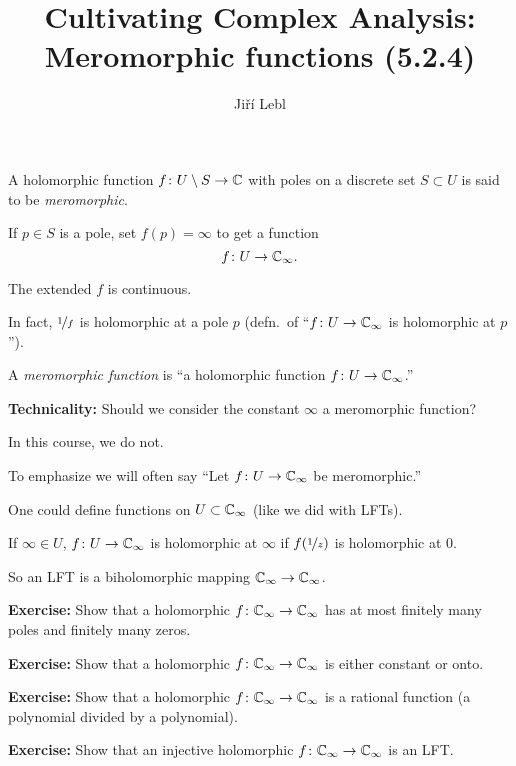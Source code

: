 \documentclass[10pt,aspectratio=169]{beamer}
\author{Ji\v{r}\'i Lebl}
\institute[OSU]{%
Departemento pri Matematiko de Oklahoma {\^S}tata Universitato}
\title{Cultivating Complex Analysis:\\%
Meromorphic functions (5.2.4)}
\date{}
\begin{document}
\begin{frame}
\titlepage
\end{frame}

\begin{frame}
\begin{definition}
A holomorphic function $f \colon U \setminus S \to {\mathbb{C}}$ with poles on a
discrete set $S \subset U$ is said to be \emph{meromorphic}.
\end{definition}

\pause

If $p \in S$ is a pole, set
$f(p) = \infty$ to get a function
\[
f \colon U \to {\mathbb{C}}_{\infty} .
\]

\pause
The extended $f$ is continuous.

\pause
\medskip

In fact, $\nicefrac{1}{f}$ is holomorphic at a pole $p$
\quad
(defn.\ of ``$f \colon U \to {\mathbb{C}}_\infty$ is holomorphic at $p$'').

\pause
\medskip

A \emph{meromorphic function} is
``a holomorphic function $f \colon U \to {\mathbb{C}}_{\infty}$.''

\pause
\medskip

\textbf{Technicality:} Should we consider the constant $\infty$
a meromorphic function?

\pause
In this course, we do not.

\pause
\medskip

To emphasize we will often say
``Let 
$f \colon U \to {\mathbb{C}}_\infty$ be meromorphic.''

\end{frame}

\begin{frame}

One could define functions on $U \subset {\mathbb{C}}_\infty$ (like we did with LFTs).

\pause
\medskip

If $\infty \in U$,
\quad
$f \colon U \to {\mathbb{C}}_\infty$ is holomorphic at $\infty$ if
$f(\nicefrac{1}{z})$ is holomorphic at $0$.

\pause
\medskip

So an LFT is a biholomorphic mapping ${\mathbb{C}}_\infty \to {\mathbb{C}}_\infty$.

\pause
\medskip

\textbf{Exercise:}
Show that a holomorphic $f \colon {\mathbb{C}}_\infty \to {\mathbb{C}}_\infty$ has
at most finitely many poles and finitely many zeros.

\pause
\medskip

\textbf{Exercise:}
Show that a holomorphic $f \colon {\mathbb{C}}_\infty \to {\mathbb{C}}_\infty$ is
either constant or onto.

\pause
\medskip

\textbf{Exercise:}
Show that a holomorphic $f \colon {\mathbb{C}}_\infty \to {\mathbb{C}}_\infty$ is a
rational function (a polynomial divided by a polynomial).

\pause
\medskip

\textbf{Exercise:}
Show that an injective holomorphic $f \colon {\mathbb{C}}_\infty \to {\mathbb{C}}_\infty$ is an
LFT\@.
\end{frame}
\end{document}
